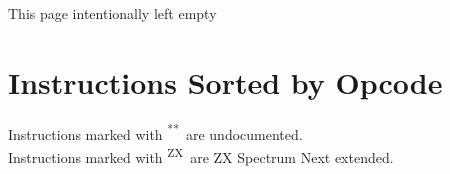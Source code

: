 \documentclass[12pt,twoside,openright,a4paper]{book}
\newcommand{\UNDOC}{\textnormal{\textsuperscript{**}}}
\newcommand{\ZXN}{\textnormal{\textsuperscript{ZX}}}
\newcommand{\IntentionallyEmpty}{
	\mbox{}
	\vfill
	\begin{center}
	This page intentionally left empty
	\end{center}
	\vfill
	\mbox{}
}
\begin{document}
\pagebreak
\IntentionallyEmpty
\pagebreak


\chapter{Instructions Sorted by Opcode}


Instructions marked with \UNDOC ~are undocumented.\\
Instructions marked with \ZXN ~are ZX Spectrum Next extended.
\end{document}
